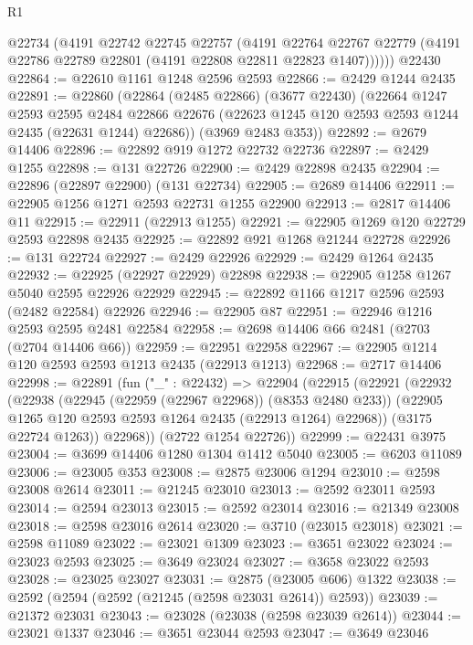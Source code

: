 \begin{lexlean}{R1}
\begin{coremodule}
        @22734
        (@4191
          @22742
          @22745
          @22757
          (@4191
            @22764
            @22767
            @22779
            (@4191 @22786 @22789 @22801 (@4191 @22808 @22811 @22823 @1407))))))
    @22430
@22864 := @22610 @1161 @1248 @2596 @2593
@22866 := @2429 @1244 @2435
@22891 := @22860
    (@22864
      (@2485 @22866)
      (@3677 @22430)
      (@22664
        @1247
        @2593
        @2595
        @2484
        @22866
        @22676
        (@22623 @1245 @120 @2593 @2593 @1244 @2435 (@22631 @1244) @22686))
      (@3969 @2483 @353))
@22892 := @2679 @14406
@22896 := @22892 @919 @1272 @22732 @22736
@22897 := @2429 @1255
@22898 := @131 @22726
@22900 := @2429 @22898 @2435
@22904 := @22896 (@22897 @22900) (@131 @22734)
@22905 := @2689 @14406
@22911 := @22905 @1256 @1271 @2593 @22731 @1255 @22900
@22913 := @2817 @14406 @11
@22915 := @22911 (@22913 @1255)
@22921 := @22905 @1269 @120 @22729 @2593 @22898 @2435
@22925 := @22892 @921 @1268 @21244 @22728
@22926 := @131 @22724
@22927 := @2429 @22926
@22929 := @2429 @1264 @2435
@22932 := @22925 (@22927 @22929) @22898
@22938 := @22905 @1258 @1267 @5040 @2595 @22926 @22929
@22945 := @22892 @1166 @1217 @2596 @2593 (@2482 @22584) @22926
@22946 := @22905 @87
@22951 := @22946 @1216 @2593 @2595 @2481 @22584
@22958 := @2698 @14406 @66 @2481 (@2703 (@2704 @14406 @66))
@22959 := @22951 @22958
@22967 := @22905 @1214 @120 @2593 @2593 @1213 @2435 (@22913 @1213)
@22968 := @2717 @14406
@22998 := @22891
    (fun ("_" : @22432) =>
    @22904
      (@22915
        (@22921
          (@22932
            (@22938
              (@22945 (@22959 (@22967 @22968)) (@8353 @2480 @233))
              (@22905 @1265 @120 @2593 @2593 @1264 @2435 (@22913 @1264) @22968))
            (@3175 @22724 @1263))
          @22968))
      (@2722 @1254 @22726))
@22999 := @22431 @3975
@23004 := @3699 @14406 @1280 @1304 @1412 @5040
@23005 := @6203 @11089
@23006 := @23005 @353
@23008 := @2875 @23006 @1294
@23010 := @2598 @23008 @2614
@23011 := @21245 @23010
@23013 := @2592 @23011 @2593
@23014 := @2594 @23013
@23015 := @2592 @23014
@23016 := @21349 @23008
@23018 := @2598 @23016 @2614
@23020 := @3710 (@23015 @23018)
@23021 := @2598 @11089
@23022 := @23021 @1309
@23023 := @3651 @23022
@23024 := @23023 @2593
@23025 := @3649 @23024
@23027 := @3658 @23022 @2593
@23028 := @23025 @23027
@23031 := @2875 (@23005 @606) @1322
@23038 := @2592 (@2594 (@2592 (@21245 (@2598 @23031 @2614)) @2593))
@23039 := @21372 @23031
@23043 := @23028 (@23038 (@2598 @23039 @2614))
@23044 := @23021 @1337
@23046 := @3651 @23044 @2593
@23047 := @3649 @23046

\end{coremodule}
\end{lexlean}
